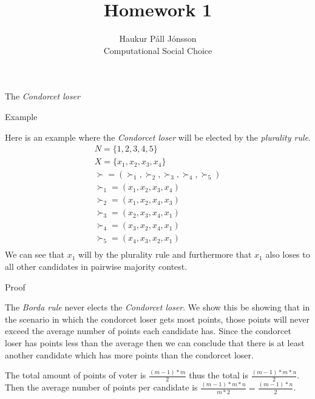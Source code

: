 \documentclass[12pt]{article}
\newenvironment{question}[2][Question]{\begin{trivlist}
\item[\hskip \labelsep {\bfseries #1}\hskip \labelsep {\bfseries #2.}]}{\end{trivlist}}
\newenvironment{answer}[2][Answer]{\begin{trivlist}
\item[\hskip \labelsep {\bfseries #1}\hskip \labelsep {\bfseries #2:}]}{\end{trivlist}}
\begin{document}
\renewcommand{\theenumi}{\roman{enumi}}

\let\oldsum\sum
\renewcommand{\sum}[3]{\oldsum\limits_{#1}^{#2}#3}
\let\oldprod\prod
\renewcommand{\prod}[3]{\oldprod\limits_{#1}^{#2}#3}

\newcommand\Dunion{
  \mathop{\mathchoice
    {\ooalign{$\displaystyle\bigcup$\cr\hss\scalebox{.65}{\raisebox{0.45ex}{\sffamily +}}\hss}}
    {\ooalign{$\textstyle\bigcup$\cr\hss\scalebox{.9}{\raisebox{0.5ex}{\tiny\sffamily +}}\hss}}
    {\ooalign{$\scriptstyle\bigcup$\cr\hss\scalebox{.45}{\raisebox{0.3ex}{\sffamily +}}\hss}}
    {\ooalign{$\scriptscriptstyle\bigcup$\cr\hss\scalebox{.38}{\raisebox{0.3ex}{\sffamily +}}\hss}}
    }
}

\title{Homework 1}
\author{Haukur Páll Jónsson\\
Computational Social Choice}

\maketitle

\begin{question}{1}

The \textit{Condorcet loser}
\end{question}

\begin{answer}{a)}{Example}

Here is an example where the \textit{Condorcet loser} will be elected by the \textit{plurality rule}.
\begin{align*}
N=\{1,2,3,4,5\} \\
X=\{x_1,x_2,x_3,x_4\} \\
\boldsymbol{\succ}=(\succ_1,\succ_2,\succ_3,\succ_4,\succ_5) \\
\succ_1=(x_1,x_2,x_3,x_4) \\
\succ_2=(x_1,x_2,x_4,x_3)\\
\succ_3=(x_2,x_3,x_4,x_1)\\
\succ_4=(x_3,x_2,x_4,x_1)\\
\succ_5=(x_4,x_3,x_2,x_1)\\
\end{align*}
We can see that $x_1$ will by the plurality rule and furthermore that $x_1$ also loses to all other candidates in pairwise majority contest.
\end{answer}

\begin{answer}{b)}{Proof}

The \textit{Borda rule} never elects the \textit{Condorcet loser}. We show this be showing that in the scenario in which the condorcet loser gets most points, those points will never exceed the average number of points each candidate has. Since the condorcet loser has points less than the average then we can conclude that there is at least another candidate which has more points than the condorcet loser.

The total amount of points of voter is $\frac{(m-1)*m}{2}$ thus the total is $\frac{(m-1)*m*n}{2}$. Then the average number of points per candidate is $\frac{(m-1)*m*n}{m*2}=\frac{(m-1)*n}{2}$.
\end{answer}
\end{document}
